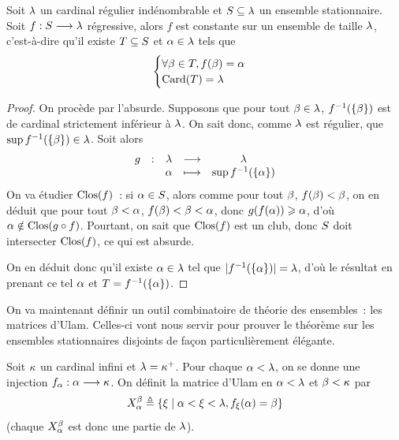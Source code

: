 \begin{lemma}\label{lem.fodor.faible}
  Soit $\lambda$ un cardinal régulier indénombrable et $S\subseteq \lambda$
  un ensemble stationnaire. Soit $f : \displaystyle S \longrightarrow \lambda$ régressive,
  alors $f$ est constante sur un ensemble de taille $\lambda$, c'est-à-dire
  qu'il existe $T\subseteq S$ et $\alpha \in \lambda$ tels que
  \[\begin{cases}
  \forall \beta \in T, f(\beta) = \alpha\\
  \operatorname{Card}(T) = \lambda
  \end{cases}\]
\end{lemma}

\begin{proof}
  On procède par l'absurde. Supposons que pour tout $\beta \in \lambda$,
  $f^{-1}(\{\beta\})$ est de cardinal strictement inférieur à $\lambda$. On
  sait donc, comme $\lambda$ est régulier, que
  $\sup f^{-1}(\{\beta\})\in \lambda$.
  Soit alors
  \[
  \makeFun{g}{\varCCl}{\varCCl}{\varOa}{\sup f^{-1}(\{\varOa\})}
  \]
  On va étudier $\operatorname{Clos}(f)$~: si $\alpha \in S$, alors comme pour tout
  $\beta$,
  $f(\beta) < \beta$, on en déduit que pour tout $\beta < \alpha$,
  $f(\beta) < \beta < \alpha$, donc $g(f(\alpha)) \geqslant \alpha$, d'où
  $\alpha \notin \operatorname{Clos}(g\circ f)$. Pourtant, on sait que $\operatorname{Clos}(f)$ est un club,
  donc $S$ doit intersecter $\operatorname{Clos}(f)$, ce qui est absurde.

  On en déduit donc qu'il existe $\alpha \in \lambda$ tel que
  $|f^{-1}(\{\alpha\})| = \lambda$, d'où le résultat en prenant ce tel $\alpha$
  et $T = f^{-1}(\{\alpha\})$.
\end{proof}

On va maintenant définir un outil combinatoire de théorie des ensembles~: les
matrices d'Ulam. Celles-ci vont nous servir pour prouver le théorème sur les
ensembles stationnaires disjoints de façon particulièrement élégante.

\begin{definition}
  Soit $\kappa$ un cardinal infini et $\lambda = \kappa^{+}$. Pour chaque
  $\alpha < \lambda$, on se donne une injection
  $f_{\alpha} : \displaystyle \alpha \longrightarrow \kappa$.
  On définit la matrice d'Ulam en $\alpha < \lambda$ et $\beta < \kappa$ par
  \[X_{\alpha}^{\beta} \triangleq
  \left\{ \xi \;\middle\vert\; \alpha < \xi < \lambda, f_{\xi}(\alpha) = \beta \right\}\]
  (chaque $X_{\alpha}^{\beta}$ est donc une partie de $\lambda$).
\end{definition}

